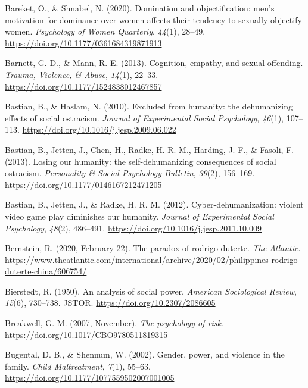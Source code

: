 \documentclass[
  donotrepeattitle,doc, 12pt, a4paper,floatsintext]{apa7}
\newlength{\cslhangindent}
\newlength{\cslentryspacingunit} %
\newenvironment{CSLReferences}[2] %
 {%
  \setlength{\parindent}{0pt}
  \ifodd #1
  \let\oldpar\par
  \def\par{\hangindent=\cslhangindent\oldpar}
  \fi
  \setlength{\parskip}{#2\cslentryspacingunit}
 }%
 {}
\begin{document}
\begin{CSLReferences}{1}{0}
\leavevmode{}%
Bareket, O., \& Shnabel, N. (2020). Domination and objectification: men's motivation for dominance over women affects their tendency to sexually objectify women. \emph{Psychology of Women Quarterly}, \emph{44}(1), 28--49. \url{https://doi.org/10.1177/0361684319871913}

\leavevmode{}%
Barnett, G. D., \& Mann, R. E. (2013). Cognition, empathy, and sexual offending. \emph{Trauma, Violence, \& Abuse}, \emph{14}(1), 22--33. \url{https://doi.org/10.1177/1524838012467857}

\leavevmode{}%
Bastian, B., \& Haslam, N. (2010). Excluded from humanity: the dehumanizing effects of social ostracism. \emph{Journal of Experimental Social Psychology}, \emph{46}(1), 107--113. \url{https://doi.org/10.1016/j.jesp.2009.06.022}

\leavevmode{}%
Bastian, B., Jetten, J., Chen, H., Radke, H. R. M., Harding, J. F., \& Fasoli, F. (2013). Losing our humanity: the self-dehumanizing consequences of social ostracism. \emph{Personality \& Social Psychology Bulletin}, \emph{39}(2), 156--169. \url{https://doi.org/10.1177/0146167212471205}

\leavevmode{}%
Bastian, B., Jetten, J., \& Radke, H. R. M. (2012). Cyber-dehumanization: violent video game play diminishes our humanity. \emph{Journal of Experimental Social Psychology}, \emph{48}(2), 486--491. \url{https://doi.org/10.1016/j.jesp.2011.10.009}

\leavevmode{}%
Bernstein, R. (2020, February 22). The paradox of rodrigo duterte. \emph{The Atlantic}. \url{https://www.theatlantic.com/international/archive/2020/02/philippines-rodrigo-duterte-china/606754/}

\leavevmode{}%
Bierstedt, R. (1950). An analysis of social power. \emph{American Sociological Review}, \emph{15}(6), 730--738. JSTOR. \url{https://doi.org/10.2307/2086605}

\leavevmode{}%
Breakwell, G. M. (2007, November). \emph{The psychology of risk}. \url{https://doi.org/10.1017/CBO9780511819315}

\leavevmode{}%
Bugental, D. B., \& Shennum, W. (2002). Gender, power, and violence in the family. \emph{Child Maltreatment}, \emph{7}(1), 55--63. \url{https://doi.org/10.1177/1077559502007001005}


\end{CSLReferences}
\end{document}
